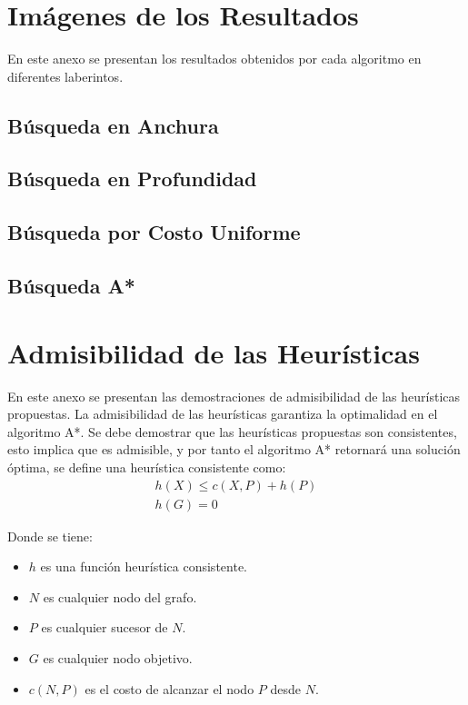 \documentclass[letter, titlepage, 10pt]{article}
\begin{document}
\newpage
\begin{appendices}
  \renewcommand\thetable{\thesection\arabic{table}}
  \renewcommand\thefigure{\thesection\arabic{figure}}
  
  \section{Imágenes de los Resultados} 
    En este anexo se presentan los resultados obtenidos por cada algoritmo en diferentes laberintos.
  \subsection{Búsqueda en Anchura}
  \subsection{Búsqueda en Profundidad}
  \subsection{Búsqueda por Costo Uniforme}
  \subsection{Búsqueda A*}
    

  \section{Admisibilidad de las Heurísticas}
    En este anexo se presentan las demostraciones de admisibilidad de las heurísticas propuestas. La admisibilidad de las heurísticas garantiza la optimalidad en el algoritmo A*.
    Se debe demostrar que las heurísticas propuestas son consistentes, esto implica que es admisible, y por tanto el algoritmo A* retornará una solución óptima, se define una heurística consistente como:
\begin{align}
h(X) \leq c(X,P) + h(P)\\
h(G) = 0
\end{align}

Donde se tiene:
\begin{itemize}
\item $h$ es una función heurística consistente.
\item $N$ es cualquier nodo del grafo.
\item $P$ es cualquier sucesor de $N$.
\item $G$ es cualquier nodo objetivo.
\item $c(N,P)$ es el costo de alcanzar el nodo $P$ desde $N$.
\end{itemize}


\end{appendices}
\end{document}

